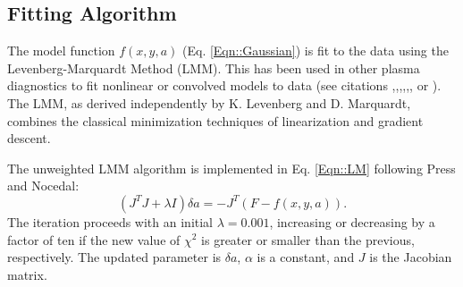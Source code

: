 	\subsection{Fitting Algorithm}\label{sec::LM}
	\hspace*{4ex}The model function $f(x,y,a)$ (Eq. \ref{Eqn::Gaussian}) is fit to the data using the Levenberg-Marquardt Method (LMM). This has been used in other plasma diagnostics to fit nonlinear or convolved models to data (see citations \cite{Nikolić200167},\cite{Heesterman},\cite{Avdeeva},\cite{Pablant},\cite{Reinke},\cite{Luxon}, or \cite{Lazerson}). The LMM, as derived independently by K. Levenberg\cite{LEVENBERG} and D. Marquardt\cite{marquardt1963algorithm}, combines the classical minimization techniques of linearization and gradient descent.

	The unweighted LMM algorithm is implemented in Eq. \ref{Eqn::LM} following Press\cite{press1996numerical} and Nocedal\cite{nocedal2006numerical}:\\
	\begin{equation}\label{Eqn::LM}
	(J^TJ+\lambda{I})\delta{a}=-J^T(F-f(x,y,a)).
	\end{equation}
	The iteration proceeds with an initial $\lambda=0.001$, increasing or decreasing by a factor of ten if the new value of $\chi^2$ is greater or smaller than the previous, respectively. The updated parameter is $\delta{a}$, $\alpha$ is a constant, and $J$ is the Jacobian matrix. 
	
